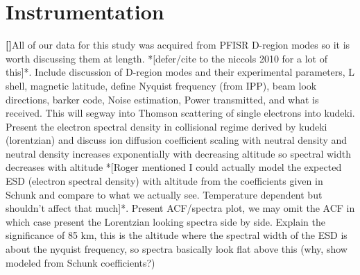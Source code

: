 \documentclass{article}
\newcounter{para}
\newcommand\mypara{\par\refstepcounter{para}\textbf{[\thepara]}\space}
\begin{document}
\section{Instrumentation}
\mypara All of our data for this study was acquired from PFISR D-region modes so it is worth discussing them at length. *[defer/cite to the niccols 2010 for a lot of this]*. Include discussion of D-region modes and their experimental parameters, L shell, magnetic latitude, define Nyquist frequency (from IPP), beam look directions, barker code, Noise estimation, Power transmitted, and what is received. This will segway into Thomson scattering of single electrons into kudeki. Present the electron spectral density in collisional regime derived by kudeki (lorentzian) and discuss ion diffusion coefficient scaling with neutral density and neutral density increases exponentially with decreasing altitude  so spectral width decreases with altitude *[Roger mentioned I could actually model the expected ESD (electron spectral density) with altitude from the coefficients given in Schunk and compare to what we actually see. Temperature dependent but shouldn't affect that much]*. Present ACF/spectra plot, we may omit the ACF in which case present the Lorentzian looking spectra side by side. Explain the significance of 85 km, this is the altitude where the spectral width of the ESD is about the nyquist frequency, so spectra basically look flat above this (why, show modeled from Schunk coefficients?)
\end{document}
